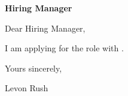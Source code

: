 \documentclass[10pt,a4paper]{article}
\providecommand{\EvidenceThree}{}
\providecommand{\HiringManager}{Hiring Manager}
\begin{document}
\fontsize{10.1}{13}\selectfont
\RaggedRight
\LetterHeader

{\fontsize{9.7}{11.8}\selectfont\color{QuietColour}\LetterDate\par}
\vspace{8pt}
{\bfseries\HiringManager\par}
\Company\par
\vspace{9pt}

Dear \HiringManager,

\vspace{8pt}
I am applying for the {\RoleTitle} role with {\Company}. \OpeningReason

\vspace{8pt}
\EvidenceOne

\vspace{8pt}
\EvidenceTwo

\ifdefempty{\EvidenceThree}{}{\vspace{8pt}\EvidenceThree}

\vspace{8pt}
\OrganisationFit

\vspace{8pt}
\ClosingParagraph

\vspace{10pt}
Yours sincerely,

\vspace{12pt}
Levon Rush
\end{document}
